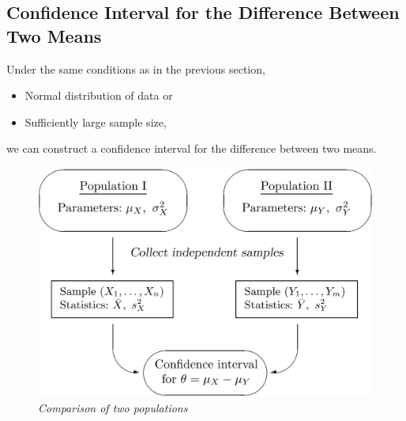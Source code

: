 \subsection{Confidence Interval for the Difference Between Two Means}
\label{subsec:conf-inter-for-diff-two-means}

Under the same conditions as in the previous section,
\begin{itemize}
  \item Normal distribution of data or
  \item Sufficiently large sample size,
\end{itemize}
\noindent we can construct a confidence interval for the difference between two means.

\begin{figure}[H]
  \centering
  \includegraphics[width=\linewidth]{img/fig-9.4.png}
  \caption{\textit{Comparison of two populations}}
  \label{fig:9.4}
\end{figure}

